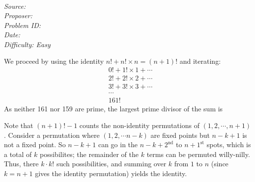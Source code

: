 \SSbreak\\
\emph{Source: \Cfolk}\\
\emph{Proposer: \Pss}\\
\emph{Problem ID: }\\
\emph{Date: }\\
\emph{Difficulty: Easy}\\
\SSbreak
 
\bigskip

\begin{solution}\hfil\medskip

We proceed by using the identity \(n!+n!\times n = (n+1)!\) and iterating:
\begin{align}
    &0!+1!\times 1+\cdots\\
    &2!+2!\times2+\cdots\\
    &3!+3!\times3+\cdots\\
    &\cdots\\
    &161!
\end{align}
As neither 161 nor 159 are prime, the largest prime divisor of the sum is 
\end{solution}\bigskip

\begin{solution}\hfil\medskip

    Note that $(n + 1)! - 1$ counts the non-identity permutations of $(1, 2, \cdots , n + 1)$. 
    Consider a permutation where $(1, 2, \cdots n - k)$ are fixed points but $n - k + 1$ is not a fixed point.
    So $n - k + 1$ can go in the $n - k + 2^{\text{nd}}$ to $n + 1^{\text{st}}$ spots, which is a total of $k$ possibilites;
    the remainder of the $k$ terms can be permuted willy-nilly. Thus, there $k \cdot k!$ such possibilities, and summing over 
    $k$ from $1$ to $n$ (since $k = n + 1$ gives the identity permutation) yields the identity. 
\end{solution}